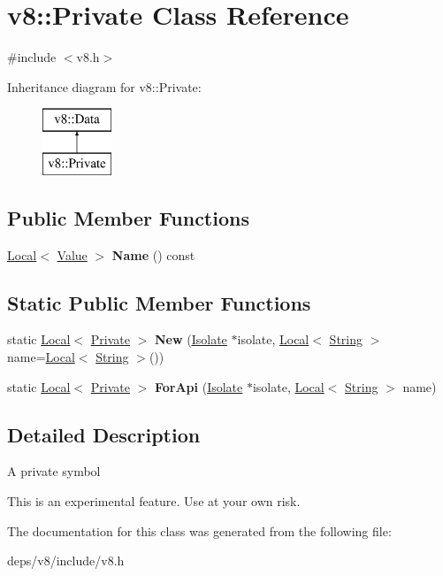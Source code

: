 \hypertarget{classv8_1_1_private}{}\section{v8\+:\+:Private Class Reference}
\label{classv8_1_1_private}


{\ttfamily \#include $<$v8.\+h$>$}

Inheritance diagram for v8\+:\+:Private\+:\begin{figure}[H]
\begin{center}
\leavevmode
\includegraphics[height=2.000000cm]{classv8_1_1_private}
\end{center}
\end{figure}
\subsection*{Public Member Functions}
\begin{DoxyCompactItemize}
\item 
\hypertarget{classv8_1_1_private_a346820b1e830262d7f4f31e5c5ac7304}{}\hyperlink{classv8_1_1_local}{Local}$<$ \hyperlink{classv8_1_1_value}{Value} $>$ {\bfseries Name} () const \label{classv8_1_1_private_a346820b1e830262d7f4f31e5c5ac7304}

\end{DoxyCompactItemize}
\subsection*{Static Public Member Functions}
\begin{DoxyCompactItemize}
\item 
\hypertarget{classv8_1_1_private_ae43aa9516121ed7a24cf5bba1654b653}{}static \hyperlink{classv8_1_1_local}{Local}$<$ \hyperlink{classv8_1_1_private}{Private} $>$ {\bfseries New} (\hyperlink{classv8_1_1_isolate}{Isolate} $\ast$isolate, \hyperlink{classv8_1_1_local}{Local}$<$ \hyperlink{classv8_1_1_string}{String} $>$ name=\hyperlink{classv8_1_1_local}{Local}$<$ \hyperlink{classv8_1_1_string}{String} $>$())\label{classv8_1_1_private_ae43aa9516121ed7a24cf5bba1654b653}

\item 
\hypertarget{classv8_1_1_private_a0ab8628387166b8a8abc6e9b6f40ad55}{}static \hyperlink{classv8_1_1_local}{Local}$<$ \hyperlink{classv8_1_1_private}{Private} $>$ {\bfseries For\+Api} (\hyperlink{classv8_1_1_isolate}{Isolate} $\ast$isolate, \hyperlink{classv8_1_1_local}{Local}$<$ \hyperlink{classv8_1_1_string}{String} $>$ name)\label{classv8_1_1_private_a0ab8628387166b8a8abc6e9b6f40ad55}

\end{DoxyCompactItemize}


\subsection{Detailed Description}
A private symbol

This is an experimental feature. Use at your own risk. 

The documentation for this class was generated from the following file\+:\begin{DoxyCompactItemize}
\item 
deps/v8/include/v8.\+h\end{DoxyCompactItemize}
